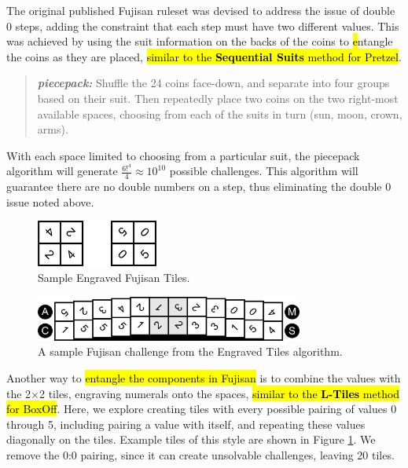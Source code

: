 \documentclass[journal]{IEEEtran}
\begin{document}
The original published Fujisan ruleset was devised to address the issue of double 0 steps, adding the constraint that each step must have two different values. This was achieved by using the suit information on the backs of the coins to {\hl entangle} the coins as they are placed, \hl{similar to the \textbf{Sequential Suits} method for Pretzel}.

\begin{quote}
    
  {\it \bf piecepack:} Shuffle the 24 coins face-down, and separate into four groups based on their suit. Then repeatedly place two coins on the two right-most available spaces, choosing from each of the suits in turn (sun, moon, crown, arms).
\end{quote}

With each space limited to choosing from a particular suit, the piecepack algorithm will generate $\frac{6!^4}{4} \approx 10^{10}$ possible challenges. This algorithm will guarantee there are no double numbers on a step, thus eliminating the double 0 issue noted above. 

\begin{figure}[t]
\centering
\includegraphics[width=4cm]{engravedsample.png}
\caption{Sample Engraved Fujisan Tiles.}
\label{fig:engravedsample}
\end{figure}


\begin{figure}[b]
\includegraphics[width=8.8cm]{fujisan-engraved.png}
\caption{A sample Fujisan challenge from the Engraved Tiles algorithm.}
\label{fig:tileexample}
\end{figure}



Another way to \hl{entangle the components in Fujisan} is to combine the values with the 2$\times$2 tiles, engraving numerals onto the spaces, \hl{similar to the \textbf{L-Tiles} method for BoxOff}. Here, we explore creating tiles with every possible pairing of values 0 through 5, including pairing a value with itself, and repeating these values diagonally on the tiles. Example tiles of this style are shown in Figure \ref{fig:engravedsample}. We remove the 0:0 pairing, since it can create unsolvable challenges, leaving 20 tiles.
\end{document}

